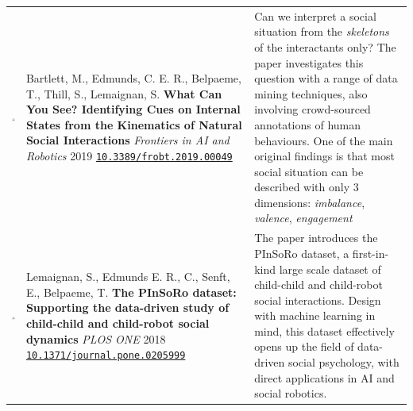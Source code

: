 \documentclass[11pt]{report}
\begin{document}
\begin{tabular}{p{1.8cm}p{6cm}p{7cm}}
    \vspace{0cm}\includegraphics[width=2cm]{thumbs/2019-science.jpg} &

    Bartlett, M., Edmunds, C. E. R., Belpaeme, T., Thill, S., Lemaignan, S. 
    \textbf{What Can You See? Identifying Cues on Internal States from the
    Kinematics of Natural Social Interactions} 
    \newline \textit{Frontiers in AI and Robotics} 2019
    \newline \texttt{\href{https://doi.org/10.3389/frobt.2019.00049}{10.3389/frobt.2019.00049}}
    & \small Can we interpret a social situation from the \emph{skeletons} of
    the interactants only? The paper investigates this question with a range of data
    mining techniques, also involving crowd-sourced annotations of human
    behaviours. One of the main original findings is that most social situation
    can be described with only 3 dimensions: \emph{imbalance}, \emph{valence},
    \emph{engagement}\\


    \vspace{0cm}\includegraphics[width=2cm]{thumbs/2019-science.jpg} &

    Lemaignan, S., Edmunds E. R., C., Senft, E., Belpaeme, T. \textbf{The
    PInSoRo dataset: Supporting the data-driven study of child-child and
    child-robot social dynamics}
    \newline \textit{PLOS ONE} 2018
    \newline
    \texttt{\href{https://doi.org/10.1371/journal.pone.0205999}{10.1371/journal.pone.0205999}}
    & \small The paper introduces the PInSoRo dataset, a first-in-kind large
    scale dataset of child-child and child-robot social interactions. Design
    with machine learning in mind, this dataset effectively opens up the field
    of data-driven social psychology, with direct applications in AI and social
    robotics.\\



\end{tabular}
\end{document}
